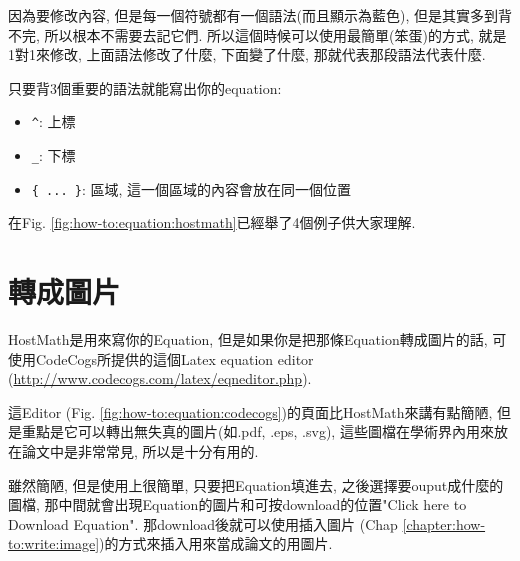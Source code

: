 
因為要修改內容, 但是每一個符號都有一個語法(而且顯示為藍色), 但是其實多到背不完, 所以根本不需要去記它們. 所以這個時候可以使用最簡單(笨蛋)的方式, 就是1對1來修改, 上面語法修改了什麼, 下面變了什麼, 那就代表那段語法代表什麼.

只要背3個重要的語法就能寫出你的equation:
  \begin{itemize}
    \item \verb|^|: 上標
    \item \verb|_|: 下標
    \item \verb|{ ... }|: 區域, 這一個區域的內容會放在同一個位置
  \end{itemize}

在Fig. \ref{fig:how-to:equation:hostmath}已經舉了4個例子供大家理解.
\newpage
\section{轉成圖片}
HostMath是用來寫你的Equation, 但是如果你是把那條Equation轉成圖片的話, 可使用CodeCogs所提供的這個Latex equation editor (\url{http://www.codecogs.com/latex/eqneditor.php})\cite{web:latex:equation:codecogs}.

這Editor (Fig. \ref{fig:how-to:equation:codecogs})的頁面比HostMath來講有點簡陋, 但是重點是它可以轉出無失真的圖片(如.pdf, .eps, .svg), 這些圖檔在學術界內用來放在論文中是非常常見, 所以是十分有用的.


雖然簡陋, 但是使用上很簡單, 只要把Equation填進去, 之後選擇要ouput成什麼的圖檔, 那中間就會出現Equation的圖片和可按download的位置"Click here to Download Equation". 那download後就可以使用插入圖片 (Chap \ref{chapter:how-to:write:image})的方式來插入用來當成論文的用圖片.

\EndChapter
